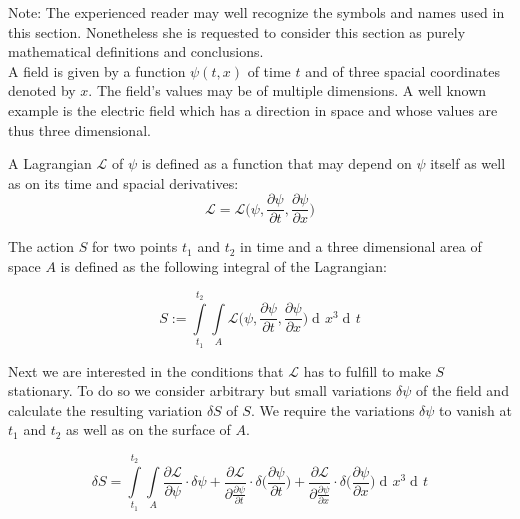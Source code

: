 \documentclass{article}
\DeclareMathOperator{\dd}{d\!}
\begin{document}
Note: The experienced reader may well recognize the symbols and names used in this section. Nonetheless she is requested to consider this section as purely mathematical definitions and conclusions. \\

A field is given by a function $\psi(t,x)$ of time $t$ and of three spacial coordinates denoted by $x$. The field's values may be of multiple dimensions. A well known example is the electric field which has a direction in space and whose values are thus three dimensional.

A Lagrangian $\mathcal{L}$ of $\psi$ is defined as a function that may depend on $\psi$ itself as well as on its time and spacial derivatives: 
\begin{equation}
\mathcal{L} = \mathcal{L}\bigg(\psi, \frac{\partial \psi}{\partial t}, \frac{\partial \psi}{\partial x}\bigg)
\end{equation}

The action $S$ for two points $t_1$ and $t_2$ in time and a three dimensional area of space $A$  is defined as the following integral of the Lagrangian:

\begin{equation}
S := \int\limits_{t_1}^{t_2} \int\limits_{A} \mathcal{L}\bigg(\psi, \frac{\partial \psi}{\partial t}, \frac{\partial \psi}{\partial x}\bigg) \dd x^3 \dd t
\end{equation}


Next we are interested in the conditions that $\mathcal{L}$ has to fulfill to make $S$ stationary. To do so we consider arbitrary but small variations $\delta\psi$ of the field and calculate the resulting variation $\delta S$ of $S$. We require the variations $\delta\psi$ to vanish at $t_1$ and $t_2$ as well as on the surface of $A$.

\begin{equation}
\delta S = \int\limits_{t_1}^{t_2} \int\limits_{A} 
\frac{\partial \mathcal{L}}{\partial \psi} \cdot \delta \psi
+ \frac{\partial \mathcal{L}}{\partial \frac{\partial \psi}{\partial t}} \cdot \delta \bigg(\frac{\partial \psi} {\partial t}\bigg)
+ \frac{\partial \mathcal{L}}{\partial \frac{\partial \psi}{\partial x}} \cdot \delta \bigg(\frac{\partial \psi} {\partial x}\bigg)
\dd x^3 \dd t
\end{equation}
\end{document}

